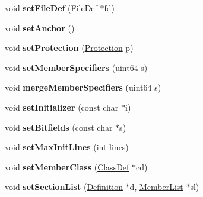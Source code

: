 \begin{DoxyCompactItemize}
\item 
\hypertarget{class_member_def_aaf99d2e7b4d7431a00fe3e970bc7f6e8}{void {\bfseries set\-File\-Def} (\hyperlink{class_file_def}{File\-Def} $\ast$fd)}\label{class_member_def_aaf99d2e7b4d7431a00fe3e970bc7f6e8}

\item 
\hypertarget{class_member_def_a3830bc7b5425eff7551c69da00ee85f1}{void {\bfseries set\-Anchor} ()}\label{class_member_def_a3830bc7b5425eff7551c69da00ee85f1}

\item 
\hypertarget{class_member_def_a6cc19181f99433807b136683170b37d0}{void {\bfseries set\-Protection} (\hyperlink{types_8h_a90e352184df58cd09455fe9996cd4ded}{Protection} p)}\label{class_member_def_a6cc19181f99433807b136683170b37d0}

\item 
\hypertarget{class_member_def_a8e58d27743b10686c867d9fab2010815}{void {\bfseries set\-Member\-Specifiers} (uint64 s)}\label{class_member_def_a8e58d27743b10686c867d9fab2010815}

\item 
\hypertarget{class_member_def_a1e676aa6ed5578c12176f5022b83a6ac}{void {\bfseries merge\-Member\-Specifiers} (uint64 s)}\label{class_member_def_a1e676aa6ed5578c12176f5022b83a6ac}

\item 
\hypertarget{class_member_def_a9e26a8a9348d03987f97bc1ac0dc9d88}{void {\bfseries set\-Initializer} (const char $\ast$i)}\label{class_member_def_a9e26a8a9348d03987f97bc1ac0dc9d88}

\item 
\hypertarget{class_member_def_ad7fc78a5a4d87df7128eb43b7c64d4fb}{void {\bfseries set\-Bitfields} (const char $\ast$s)}\label{class_member_def_ad7fc78a5a4d87df7128eb43b7c64d4fb}

\item 
\hypertarget{class_member_def_a7f801b33c676ae4bd80f377121583eb1}{void {\bfseries set\-Max\-Init\-Lines} (int lines)}\label{class_member_def_a7f801b33c676ae4bd80f377121583eb1}

\item 
\hypertarget{class_member_def_a56222a89592e068b4a73f7969fb701f5}{void {\bfseries set\-Member\-Class} (\hyperlink{class_class_def}{Class\-Def} $\ast$cd)}\label{class_member_def_a56222a89592e068b4a73f7969fb701f5}

\item 
\hypertarget{class_member_def_a0a95e576e13d3ce3b9f3657a44bd8473}{void {\bfseries set\-Section\-List} (\hyperlink{class_definition}{Definition} $\ast$d, \hyperlink{class_member_list}{Member\-List} $\ast$sl)}\label{class_member_def_a0a95e576e13d3ce3b9f3657a44bd8473}


\end{DoxyCompactItemize}
